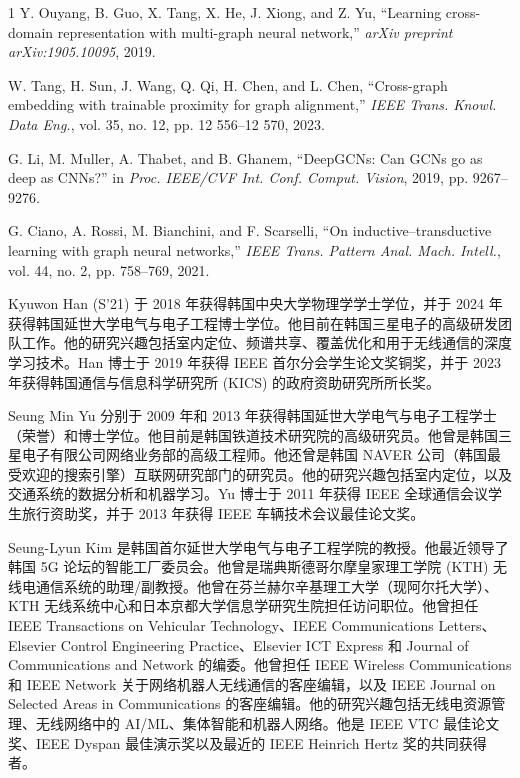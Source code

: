 \documentclass[journal]{IEEEtran}
\begin{document}
\begin{thebibliography}{1}
Y. Ouyang, B. Guo, X. Tang, X. He, J. Xiong, and Z. Yu, ``Learning cross-domain representation with multi-graph neural network,'' \emph{arXiv preprint arXiv:1905.10095}, 2019.

W. Tang, H. Sun, J. Wang, Q. Qi, H. Chen, and L. Chen, ``Cross-graph embedding with trainable proximity for graph alignment,'' \emph{IEEE Trans. Knowl. Data Eng.}, vol. 35, no. 12, pp. 12 556–12 570, 2023.

G. Li, M. Muller, A. Thabet, and B. Ghanem, ``DeepGCNs: Can GCNs go as deep as CNNs?'' in \emph{Proc. IEEE/CVF Int. Conf. Comput. Vision}, 2019, pp. 9267–9276.

G. Ciano, A. Rossi, M. Bianchini, and F. Scarselli, ``On inductive–transductive learning with graph neural networks,'' \emph{IEEE Trans. Pattern Anal. Mach. Intell.}, vol. 44, no. 2, pp. 758–769, 2021.

\end{thebibliography}

\begin{IEEEbiographynophoto}{Kyuwon Han}
(S'21) 于 2018 年获得韩国中央大学物理学学士学位，并于 2024 年获得韩国延世大学电气与电子工程博士学位。他目前在韩国三星电子的高级研发团队工作。他的研究兴趣包括室内定位、频谱共享、覆盖优化和用于无线通信的深度学习技术。Han 博士于 2019 年获得 IEEE 首尔分会学生论文奖铜奖，并于 2023 年获得韩国通信与信息科学研究所 (KICS) 的政府资助研究所所长奖。
\end{IEEEbiographynophoto}

\begin{IEEEbiographynophoto}{Seung Min Yu}
分别于 2009 年和 2013 年获得韩国延世大学电气与电子工程学士（荣誉）和博士学位。他目前是韩国铁道技术研究院的高级研究员。他曾是韩国三星电子有限公司网络业务部的高级工程师。他还曾是韩国 NAVER 公司（韩国最受欢迎的搜索引擎）互联网研究部门的研究员。他的研究兴趣包括室内定位，以及交通系统的数据分析和机器学习。Yu 博士于 2011 年获得 IEEE 全球通信会议学生旅行资助奖，并于 2013 年获得 IEEE 车辆技术会议最佳论文奖。
\end{IEEEbiographynophoto}

\begin{IEEEbiographynophoto}{Seung-Lyun Kim}
是韩国首尔延世大学电气与电子工程学院的教授。他最近领导了韩国 5G 论坛的智能工厂委员会。他曾是瑞典斯德哥尔摩皇家理工学院 (KTH) 无线电通信系统的助理/副教授。他曾在芬兰赫尔辛基理工大学（现阿尔托大学）、KTH 无线系统中心和日本京都大学信息学研究生院担任访问职位。他曾担任 IEEE Transactions on Vehicular Technology、IEEE Communications Letters、Elsevier Control Engineering Practice、Elsevier ICT Express 和 Journal of Communications and Network 的编委。他曾担任 IEEE Wireless Communications 和 IEEE Network 关于网络机器人无线通信的客座编辑，以及 IEEE Journal on Selected Areas in Communications 的客座编辑。他的研究兴趣包括无线电资源管理、无线网络中的 AI/ML、集体智能和机器人网络。他是 IEEE VTC 最佳论文奖、IEEE Dyspan 最佳演示奖以及最近的 IEEE Heinrich Hertz 奖的共同获得者。
\end{IEEEbiographynophoto}
\end{document}

